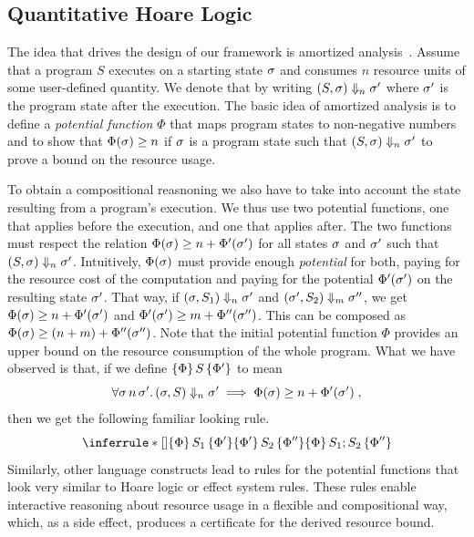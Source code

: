 \documentclass[nocopyrightspace,preprint]{sigplanconf}
\begin{document}
\subsection{Quantitative Hoare Logic}

The idea that drives the design of our framework is amortized
analysis~\cite{Tarjan-amort}.  Assume that a program $S$ executes on a
starting state $\sigma$ and consumes $n$ resource units of some
user-defined quantity.  We denote that by writing $(S, \sigma)
\Downarrow_n \sigma'$ where $\sigma'$ is the program state after the
execution.  The basic idea of amortized analysis is to define a
\emph{potential function} $\Phi$ that maps program states to non-negative
numbers and to show that $\Phi(\sigma) \geq n$ if $\sigma$ is a
program state such that $(S, \sigma) \Downarrow_n \sigma'$ to prove
a bound on the resource usage.

To obtain a compositional reasnoning we also have to take into account
the state resulting from a program's execution.  We thus use two
potential functions, one that applies before the execution, and one
that applies after.  The two functions must respect the relation
$\Phi(\sigma) \ge n + \Phi'(\sigma')$ for all states $\sigma$ and
$\sigma'$ such that $(S, \sigma) \Downarrow_n \sigma'$.  Intuitively,
$\Phi(\sigma)$ must provide enough \emph{potential} for both, paying
for the resource cost of the computation and paying for the potential
$\Phi'(\sigma')$ on the resulting state $\sigma'$. That way, if
$(\sigma, S_1) \Downarrow_n \sigma'$ and $(\sigma', S_2) \Downarrow_m
\sigma''$, we get $\Phi(\sigma) \ge n + \Phi'(\sigma')$ and
$\Phi'(\sigma') \ge m + \Phi''(\sigma'')$.  This can be composed as
$\Phi(\sigma) \ge (n + m) + \Phi''(\sigma'')$.  Note that the initial
potential function $\Phi$ provides an upper bound on the resource
consumption of the whole program.  What we have observed is that, if
we define $\{\Phi\}\, S\, \{\Phi'\}$ to mean
$$
\forall \sigma\, n\, \sigma'.\, (\sigma, S) \Downarrow_n \sigma' \implies \Phi(\sigma) \ge
n + \Phi'(\sigma') \; ,
$$
then we get the following familiar looking rule.
$$
\RuleNolabel
{\htriple{\Phi}{S_1}{\Phi'} \\ \htriple{\Phi'}{S_2}{\Phi''}}
{\htriple{\Phi} {S_1; S_2}  {\Phi''}}
$$
%
Similarly, other language constructs lead to rules for the potential
functions that look very similar to Hoare logic or effect system
rules.  These rules enable interactive reasoning about resource usage
in a flexible and compositional way, which, as a side effect, produces
a certificate for the derived resource bound.
\end{document}
